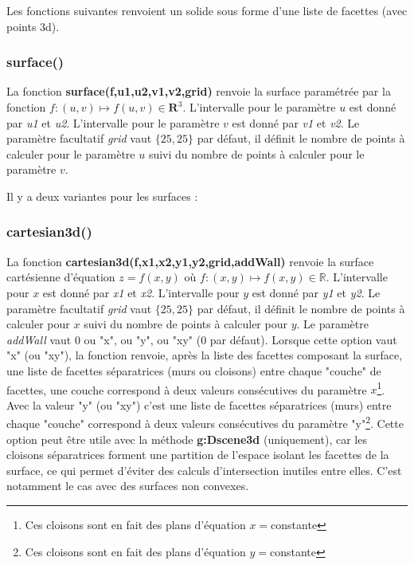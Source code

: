 Les fonctions suivantes renvoient un solide sous forme d'une liste de facettes (avec points 3d).
\subsubsection{surface()}
    
La fonction \textbf{surface(f,u1,u2,v1,v2,grid)} renvoie la surface paramétrée par la fonction $f\colon(u,v) \mapsto f(u,v)\in \mathbf R^3$. L'intervalle pour le paramètre $u$ est donné par \emph{u1} et \emph{u2}. L'intervalle pour le paramètre $v$ est donné par \emph{v1} et \emph{v2}. Le paramètre facultatif \emph{grid} vaut $\{25,25\}$ par défaut, il définit le nombre de points à calculer pour le paramètre $u$ suivi du nombre de points à calculer pour le paramètre $v$. 
    
Il y a deux variantes pour les surfaces :

\subsubsection{cartesian3d()}

La fonction \textbf{cartesian3d(f,x1,x2,y1,y2,grid,addWall)} renvoie la surface cartésienne d'équation $z=f(x,y)$ où $f\colon(x,y)\mapsto f(x,y)\in\mathbb R$. L'intervalle pour $x$ est donné par \emph{x1} et \emph{x2}. L'intervalle pour $y$ est donné par \emph{y1} et \emph{y2}. Le paramètre facultatif \emph{grid} vaut $\{25,25\}$ par défaut, il définit le nombre de points à calculer pour $x$ suivi du nombre de points à calculer pour $y$. Le paramètre \emph{addWall} vaut 0 ou "x", ou "y", ou "xy" (0 par défaut). Lorsque cette option vaut "x" (ou "xy"), la fonction renvoie, après la liste des facettes composant la surface, une liste de facettes séparatrices (murs ou cloisons) entre chaque "couche" de facettes, une couche correspond à deux valeurs consécutives du paramètre $x$\footnote{Ces cloisons sont en fait des plans d'équation $x=$constante}. Avec la valeur "y" (ou "xy") c'est une liste de facettes séparatrices (murs) entre chaque "couche" correspond à deux valeurs consécutives du paramètre "y"\footnote{Ces cloisons sont en fait des plans d'équation $y=$constante}. Cette option peut être utile avec la méthode \textbf{g:Dscene3d} (uniquement), car les cloisons séparatrices forment une partition de l'espace isolant les facettes de la surface, ce qui permet d'éviter des calculs d'intersection inutiles entre elles. C'est notamment le cas avec des surfaces non convexes.

